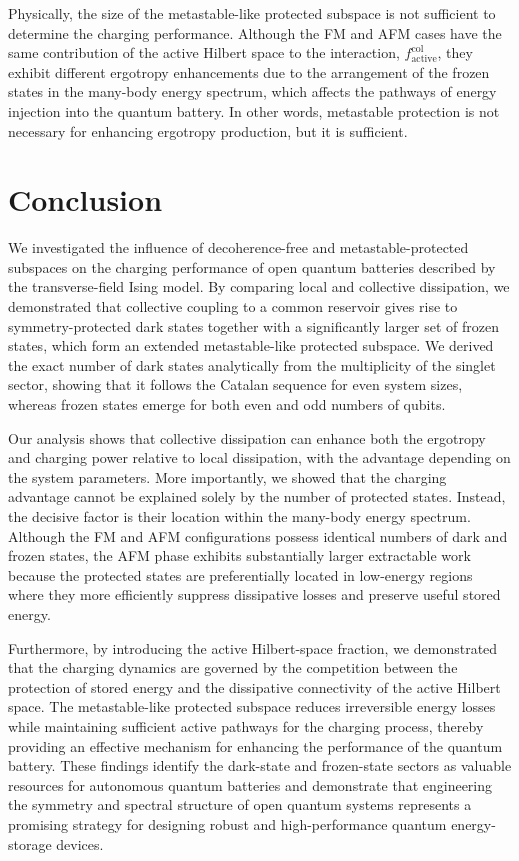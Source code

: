 \documentclass[aps,superscriptaddress,twocolumn,pre,longbibliography,floatfix]{revtex4-1}
\begin{document}
	Physically, the size of the metastable-like protected subspace is not sufficient to determine the charging performance. Although the FM and AFM cases have the same contribution of the active Hilbert space to the interaction, $f_{\mathrm{active}}^{\mathrm{col}}$, they exhibit different ergotropy enhancements due to the arrangement of the frozen states in the many-body energy spectrum, which affects the pathways of energy injection into the quantum battery. In other words, metastable protection is not necessary for enhancing ergotropy production, but it is sufficient.
	
	
	\section{Conclusion}\label{conc}
	We investigated the influence of decoherence-free and metastable-protected subspaces on the charging performance of open quantum batteries described by the transverse-field Ising model. By comparing local and collective dissipation, we demonstrated that collective coupling to a common reservoir gives rise to symmetry-protected dark states together with a significantly larger set of frozen states, which form an extended metastable-like protected subspace. We derived the exact number of dark states analytically from the multiplicity of the singlet sector, showing that it follows the Catalan sequence for even system sizes, whereas frozen states emerge for both even and odd numbers of qubits.
	
	Our analysis shows that collective dissipation can enhance both the ergotropy and charging power relative to local dissipation, with the advantage depending on the system parameters. More importantly, we showed that the charging advantage cannot be explained solely by the number of protected states. Instead, the decisive factor is their location within the many-body energy spectrum. Although the FM and AFM configurations possess identical numbers of dark and frozen states, the AFM phase exhibits substantially larger extractable work because the protected states are preferentially located in low-energy regions where they more efficiently suppress dissipative losses and preserve useful stored energy.
	
	Furthermore, by introducing the active Hilbert-space fraction, we demonstrated that the charging dynamics are governed by the competition between the protection of stored energy and the dissipative connectivity of the active Hilbert space. The metastable-like protected subspace reduces irreversible energy losses while maintaining sufficient active pathways for the charging process, thereby providing an effective mechanism for enhancing the performance of the quantum battery. These findings identify the dark-state and frozen-state sectors as valuable resources for autonomous quantum batteries and demonstrate that engineering the symmetry and spectral structure of open quantum systems represents a promising strategy for designing robust and high-performance quantum energy-storage devices.
	
\end{document}
